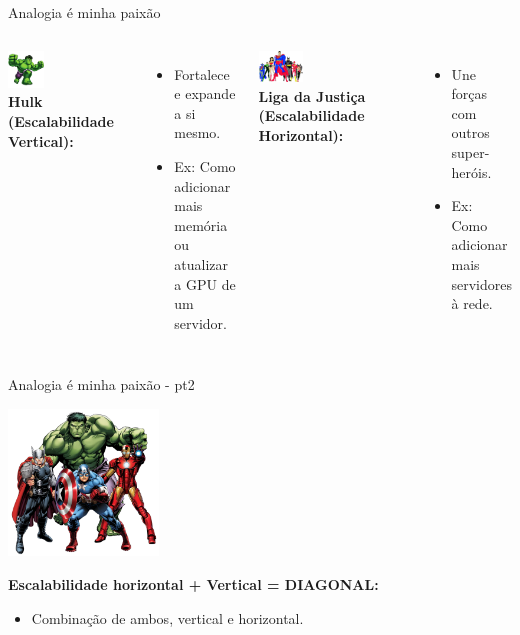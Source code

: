 \documentclass{beamer}
\begin{document}
\begin{frame}{Analogia é minha paixão}

	\begin{columns}
		\centering
		\includegraphics[width=0.3\textwidth]{assets/lesa6/hulk.png} \\
		\textbf{Hulk (Escalabilidade Vertical):}
		\begin{itemize}
			\item Fortalece e expande a si mesmo.
			\item Ex: Como adicionar mais memória ou atualizar a GPU de um servidor.
		\end{itemize}

		\centering
		\includegraphics[width=0.3\textwidth]{assets/lesa6/liga.png} \\
		\textbf{Liga da Justiça (Escalabilidade Horizontal):}
		\begin{itemize}
			\item Une forças com outros super-heróis.
			\item Ex: Como adicionar mais servidores à rede.
		\end{itemize}
	\end{columns}

\end{frame}

\begin{frame}{Analogia é minha paixão - pt2}

    \centering
    \includegraphics[width=0.3\textwidth]{assets/lesa6/misto.png}
    
    \begin{flushleft}
        \textbf{Escalabilidade horizontal + Vertical = DIAGONAL:}
        \begin{itemize}
            \item Combinação de ambos, vertical e horizontal.
        \end{itemize}
    \end{flushleft}
    
    \end{frame}
\end{document}
